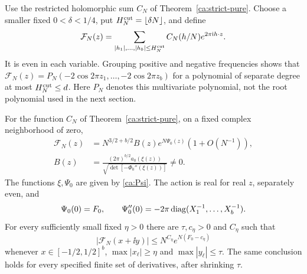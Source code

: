 Use the restricted holomorphic sum $C_N$ of
Theorem~\ref{ca:strict-pure}. Choose a smaller fixed
$0<\delta<1/4$, put
$H_N^{\rm cut}=\lfloor\delta N\rfloor$, and define
\begin{equation}\label{ca:Fourier-source}
 \mathcal F_N(z)=
 \sum_{|h_1|,\ldots,|h_b|\le H_N^{\rm cut}}
 C_N(h/N)e^{2\pi\mathrm i h\cdot z}.
\end{equation}
It is even in each variable. Grouping positive and negative frequencies shows that
$\mathcal F_N(z)=P_N(-2\cos2\pi z_1,\ldots,-2\cos2\pi z_b)$
for a polynomial of separate degree at most $H_N^{\rm cut}\le d$.
Here $P_N$ denotes this multivariate polynomial, not the root polynomial used in the next section.

\begin{proposition}\label{ca:Fourier-theorem}
For the function $C_N$ of Theorem~\ref{ca:strict-pure}, on a fixed complex neighborhood of zero,
\begin{align}
 \mathcal F_N(z)&=
 N^{3/2+b/2}B(z)e^{N\Psi_0(z)}(1+O(N^{-1})),\label{ca:Fourier-local}\\
 B(z)&=\frac{(2\pi)^{b/2}a_0(\xi(z))}
             {\sqrt{\det[-\Phi_0''(\xi(z))]}}\ne0.\label{ca:Fourier-amplitude}
\end{align}
The functions $\xi,\Psi_0$ are given by \eqref{ca:Psi}.
The action is real for real $z$, separately even, and
\begin{equation}\label{ca:Fourier-Hessian}
 \Psi_0(0)=F_0,\qquad
 \Psi_0''(0)=-2\pi\operatorname{diag}(X_1^{-1},\ldots,X_b^{-1}).
\end{equation}
For every sufficiently small fixed $\eta>0$ there are $\tau,c_\eta>0$ and $C_\eta$ such that
\begin{equation}\label{ca:Fourier-global}
 |\mathcal F_N(x+\ii y)|
 \le N^{C_\eta}e^{N(F_0-c_\eta)}
\end{equation}
whenever $x\in[-1/2,1/2]^b$, $\max|x_\ell|\ge\eta$ and
$\max|y_\ell|\le\tau$. The same conclusion holds for every specified finite set of derivatives, after shrinking $\tau$.
\end{proposition}


